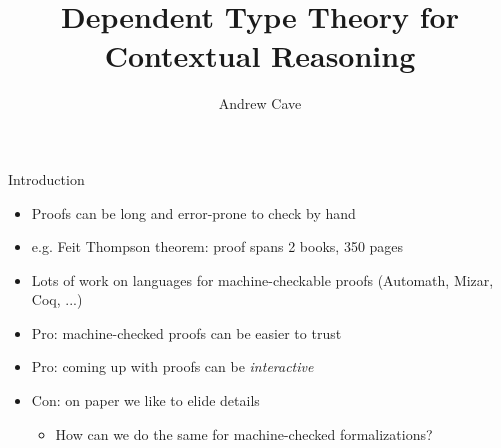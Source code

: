 \documentclass[usenames,dvipsnames]{beamer}
\author{Andrew Cave}
\title[{\makebox[.45\paperwidth]{Dependent Type Theory for Contextual Reasoning\hfill%
       \insertframenumber/\inserttotalframenumber}}]{Dependent Type Theory for Contextual Reasoning}
\begin{document}
\begin{frame}
\titlepage
\end{frame}

\begin{frame}{Introduction}
\begin{itemize}
\item Proofs can be long and error-prone to check by hand
\pause
\item e.g. Feit Thompson theorem: proof spans 2 books, 350 pages
\pause
\item Lots of work on languages for machine-checkable proofs (Automath, Mizar, Coq, ...)
\pause \item {\color{green} Pro:} machine-checked proofs can be easier to trust
\pause \item {\color{green} Pro:} coming up with proofs can be \emph{interactive}
\pause \item {\color{red} Con:} on paper we like to elide details
\begin{itemize}
\item How can we do the same for machine-checked formalizations?
\end{itemize}
\end{itemize}
\end{frame}
\end{document}
